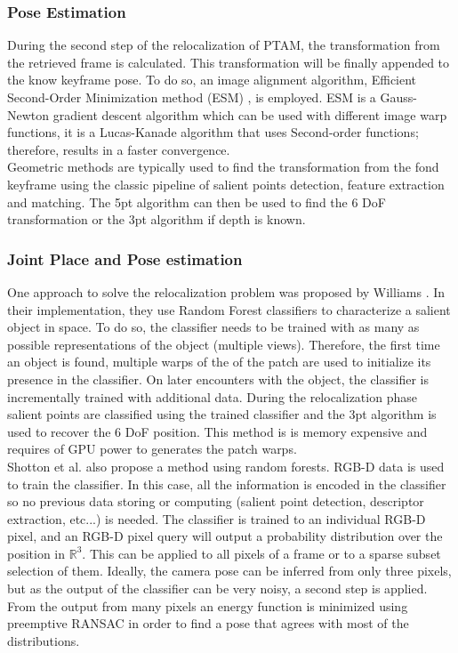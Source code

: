 \subsubsection{Pose Estimation}
\label{ssub:pose_estimation}


During the second step of the relocalization of PTAM, the transformation from the retrieved frame is calculated. This transformation will be finally appended to the know keyframe pose. To do so, an image alignment algorithm, Efficient Second-Order Minimization method (ESM) \cite{Benhimane2006}, is employed. ESM is a Gauss-Newton gradient descent algorithm which can be used with different image warp functions, it is a Lucas-Kanade \cite{Baker2004} algorithm that uses Second-order functions; therefore, results in a faster convergence.\\

Geometric methods are typically used to find the transformation from the fond keyframe using the classic pipeline of salient points detection, feature extraction and matching. The 5pt algorithm can then be used to find the 6 DoF transformation or the 3pt algorithm if depth is known.


\subsubsection{Joint Place and Pose estimation}
\label{ssub:joint_place_and_pose_estimaton}

One approach to solve the relocalization problem was proposed by Williams \cite{Williams2007}. In their implementation, they use Random Forest classifiers to characterize a salient object in space. To do so, the classifier needs to be trained with as many as possible representations of the object (multiple views). Therefore, the first time an object is found, multiple warps of the of the patch are used to initialize its presence in the classifier. On later encounters with the object, the classifier is incrementally trained with additional data. During the relocalization phase salient points are classified using the trained classifier and the 3pt algorithm is used to recover the 6 DoF position. This method is is memory expensive and requires of GPU power to generates the patch warps.\\

Shotton et al. \cite{Shotton2013} also propose a method using random forests. RGB-D data is used to train the classifier. In this case, all the information is encoded in the classifier so no previous data storing or computing (salient point detection, descriptor extraction, etc...) is needed. The classifier is trained to an individual RGB-D pixel, and an RGB-D pixel query will output a probability distribution over the position in $\mathbb{R}^3$. This can be applied to all pixels of a frame or to a sparse subset selection of them. Ideally, the camera pose can be inferred from only three pixels, but as the output of the classifier can be very noisy, a second step is applied. From the output from many pixels an energy function is minimized using preemptive RANSAC in order to find a pose that agrees with most of the distributions.\\

